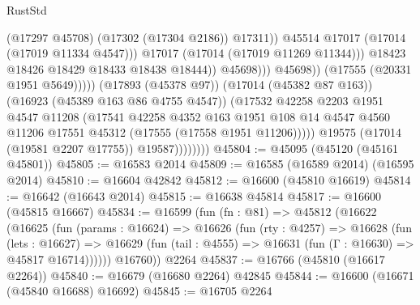 \begin{lexlean}{RustStd}
\begin{coremodule}
                                                  (@17297 @45708)
                                                  (@17302 (@17304 @2186))
                                                  @17311))
                                              @45514
                                              @17017
                                              (@17014 (@17019 @11334 @4547)))
                                            @17017
                                            (@17014 (@17019 @11269 @11344)))
                                          @18423
                                          @18426
                                          @18429
                                          @18433
                                          @18438
                                          @18444))
                                      @45698)))
                                @45698))
                            (@17555 (@20331 @1951 @5649)))))
                      (@17893 (@45378 @97))
                      (@17014 (@45382 @87 @163))
                      (@16923 (@45389 @163 @86 @4755 @4547))
                      (@17532
                        @42258
                        @2203
                        @1951
                        @4547
                        @11208
                        (@17541
                          @42258
                          @4352
                          @163
                          @1951
                          @108
                          @14
                          @4547
                          @4560
                          @11206
                          @17551
                          @45312
                          (@17555 (@17558 @1951 @11206)))))
                    @19575
                    (@17014 (@19581 @2207 @17755))
                    @19587))))))))
@45804 := @45095 (@45120 (@45161 @45801))
@45805 := @16583 @2014
@45809 := @16585 (@16589 @2014) (@16595 @2014)
@45810 := @16604 @42842
@45812 := @16600 (@45810 @16619)
@45814 := @16642 (@16643 @2014)
@45815 := @16638 @45814
@45817 := @16600 (@45815 @16667)
@45834 := @16599
    (fun (fn : @81) =>
    @45812
      (@16622
        (@16625
          (fun (params : @16624) =>
          @16626
            (fun (rty : @4257) =>
            @16628
              (fun (lets : @16627) =>
              @16629 (fun (tail : @4555) => @16631 (fun (Γ : @16630) => @45817 @16714))))))
        @16760))
    @2264
@45837 := @16766 (@45810 (@16617 @2264))
@45840 := @16679 (@16680 @2264) @42845
@45844 := @16600 (@16671 (@45840 @16688) @16692)
@45845 := @16705 @2264

\end{coremodule}
\end{lexlean}
